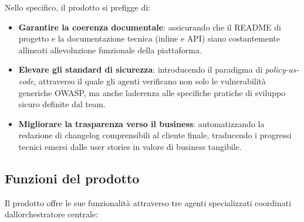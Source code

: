 \documentclass[12pt, a4paper]{article}
\begin{document}
Nello specifico, il prodotto si prefigge di:

\begin{itemize}
\item
  \textbf{Garantire la coerenza documentale}: assicurando che il README
  di progetto e la documentazione tecnica (inline e API) siano
  costantemente allineati all\textquotesingle evoluzione funzionale
  della piattaforma.
\item
  \textbf{Elevare gli standard di sicurezza}: introducendo il paradigma
  di \emph{policy-as-code}, attraverso il quale gli agenti verificano
  non solo le vulnerabilità generiche OWASP, ma anche
  l\textquotesingle aderenza alle specifiche pratiche di sviluppo sicuro
  definite dal team.
\item
  \textbf{Migliorare la trasparenza verso il business}: automatizzando
  la redazione di changelog comprensibili al cliente finale, traducendo
  i progressi tecnici emersi dalle user stories in valore di business
  tangibile.
\end{itemize}

\subsection{Funzioni del prodotto}\label{funzioni-del-prodotto}

Il prodotto offre le sue funzionalità attraverso tre agenti
specializzati coordinati dall\textquotesingle orchestratore centrale:
\end{document}
